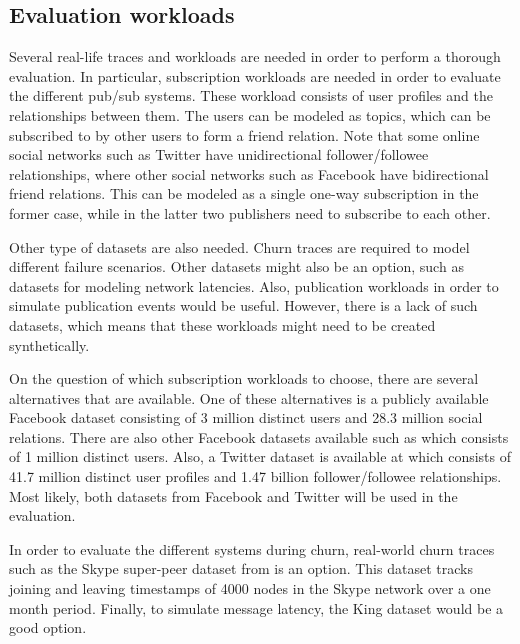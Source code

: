 \subsection{Evaluation workloads}

    Several real-life traces and workloads are needed in order to
    perform a thorough evaluation. In particular, subscription workloads
    are needed in order to evaluate the different pub/sub systems. These
    workload consists of user profiles and the relationships between
    them. The users can be modeled as topics, which can be subscribed to
    by other users to form a friend relation. Note that some online
    social networks such as Twitter have unidirectional
    follower/followee relationships, where other social networks such as
    Facebook have bidirectional friend relations. This can be modeled as
    a single one-way subscription in the former case, while in the
    latter two publishers need to subscribe to each other. 
    
    Other type of datasets are also needed. Churn traces are required to
    model different failure scenarios. Other datasets might also be an
    option, such as datasets for modeling network latencies. Also,
    publication workloads in order to simulate publication events would
    be useful. However, there is a lack of such datasets, which means that
    these workloads might need to be created synthetically.

    On the question of which subscription workloads to choose, there are several
    alternatives that are available. One of these alternatives is a
    publicly available Facebook dataset \cite{facebook-eurosys09} consisting of 3
    million distinct users and 28.3 million social relations. There are
    also other Facebook datasets available such as 
     \cite{kurant11_magnifying} which consists of 1 million distinct
    users. Also, a Twitter dataset is available at \cite{Kwak10www}
    which consists of 41.7 million distinct user profiles and 1.47
    billion follower/followee relationships. Most likely, both datasets
    from Facebook and Twitter will be used in the evaluation.
    
    In order to evaluate the different systems during churn, real-world
    churn traces such as the Skype super-peer dataset from
    \cite{Guha:2006} is an option. This dataset tracks joining and
    leaving timestamps of 4000 nodes in the Skype network over a one
    month period. Finally, to simulate message latency, the King dataset
    \cite{king} would be a good option.

